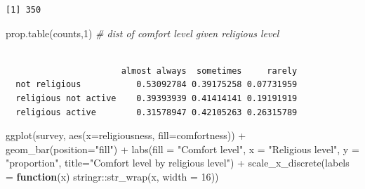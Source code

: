 \documentclass[
]{book}
\newenvironment{Shaded}{\begin{snugshade}}{\end{snugshade}}
\newcommand{\AttributeTok}[1]{\textcolor[rgb]{0.77,0.63,0.00}{#1}}
\newcommand{\CommentTok}[1]{\textcolor[rgb]{0.56,0.35,0.01}{\textit{#1}}}
\newcommand{\ControlFlowTok}[1]{\textcolor[rgb]{0.13,0.29,0.53}{\textbf{#1}}}
\newcommand{\DecValTok}[1]{\textcolor[rgb]{0.00,0.00,0.81}{#1}}
\newcommand{\FunctionTok}[1]{\textcolor[rgb]{0.00,0.00,0.00}{#1}}
\newcommand{\NormalTok}[1]{#1}
\newcommand{\SpecialCharTok}[1]{\textcolor[rgb]{0.00,0.00,0.00}{#1}}
\newcommand{\StringTok}[1]{\textcolor[rgb]{0.31,0.60,0.02}{#1}}
\begin{document}
\begin{verbatim}
[1] 350
\end{verbatim}

\begin{Shaded}
\begin{Highlighting}[]
\FunctionTok{prop.table}\NormalTok{(counts,}\DecValTok{1}\NormalTok{)  }\CommentTok{\# dist of comfort level given religious level}
\end{Highlighting}
\end{Shaded}

\begin{verbatim}
                      
                       almost always  sometimes     rarely
  not religious           0.53092784 0.39175258 0.07731959
  religious not active    0.39393939 0.41414141 0.19191919
  religious active        0.31578947 0.42105263 0.26315789
\end{verbatim}

\begin{Shaded}
\begin{Highlighting}[]
\FunctionTok{ggplot}\NormalTok{(survey, }\FunctionTok{aes}\NormalTok{(}\AttributeTok{x=}\NormalTok{religiousness, }\AttributeTok{fill=}\NormalTok{comfortness)) }\SpecialCharTok{+}
  \FunctionTok{geom\_bar}\NormalTok{(}\AttributeTok{position=}\StringTok{"fill"}\NormalTok{) }\SpecialCharTok{+}
  \FunctionTok{labs}\NormalTok{(}\AttributeTok{fill =} \StringTok{"Comfort level"}\NormalTok{, }\AttributeTok{x =} \StringTok{"Religious level"}\NormalTok{, }\AttributeTok{y =} \StringTok{"proportion"}\NormalTok{, }
       \AttributeTok{title=}\StringTok{"Comfort level by religious level"}\NormalTok{) }\SpecialCharTok{+}
    \FunctionTok{scale\_x\_discrete}\NormalTok{(}\AttributeTok{labels =} \ControlFlowTok{function}\NormalTok{(x) stringr}\SpecialCharTok{::}\FunctionTok{str\_wrap}\NormalTok{(x, }\AttributeTok{width =} \DecValTok{16}\NormalTok{))}
\end{Highlighting}
\end{Shaded}
\end{document}
